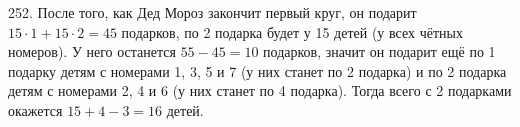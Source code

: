 252. После того, как Дед Мороз закончит первый круг, он подарит $15\cdot1+15\cdot2=45$ подарков, по 2 подарка будет у 15 детей (у всех чётных номеров). У него останется $55-45=10$ подарков, значит он подарит ещё по 1 подарку детям с номерами 1, 3, 5 и 7 (у них станет по 2 подарка) и по 2 подарка детям с номерами 2, 4 и 6 (у них станет по 4 подарка). Тогда всего с 2 подарками окажется $15+4-3=16$ детей.\\

